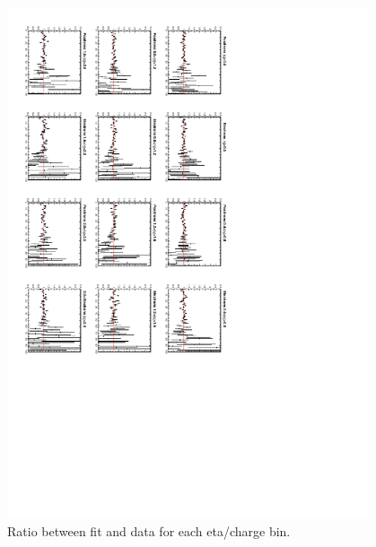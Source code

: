 \begin{figure}
  \begin{center}
\includegraphics[angle=90,width=0.95\textwidth]{Dec22_fitratio}%
     \caption{\label{fig:datafitratio}Ratio between fit and data for each eta/charge bin.}
  \end{center}
\end{figure}

